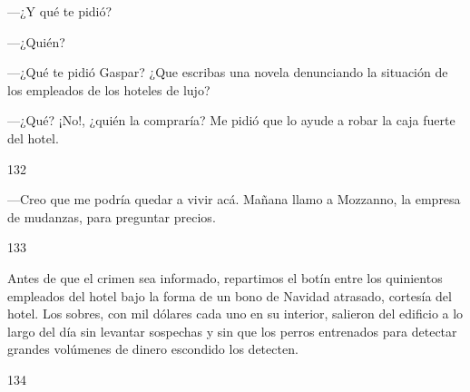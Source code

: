 \documentclass[12pt,twoside,openright,a5paper]{book}
\begin{document}
\nopagebreak

\vspace{0.5cm}

\nopagebreak

---¿Y qué te pidió?

---¿Quién?

---¿Qué te pidió Gaspar? ¿Que escribas una novela denunciando la situación de los empleados de los hoteles de lujo?

---¿Qué? ¡No!, ¿quién la compraría? Me pidió que lo ayude a robar la caja fuerte del hotel.

\vspace{0.5cm}

\hrulefill \hspace{0.1cm}\decofourleft\hspace{0.2cm} 132 \hspace{0.2cm}\decofourright \hspace{0.1cm}\hrulefill

\nopagebreak

\vspace{0.5cm}

\nopagebreak

---Creo que me podría quedar a vivir acá. Mañana llamo a Mozzanno, la empresa de mudanzas, para preguntar precios.

\vspace{0.5cm}

\hrulefill \hspace{0.1cm}\decofourleft\hspace{0.2cm} 133 \hspace{0.2cm}\decofourright \hspace{0.1cm}\hrulefill

\nopagebreak

\vspace{0.5cm}

\nopagebreak

Antes de que el crimen sea informado, repartimos el botín entre los quinientos
empleados del hotel bajo la forma de un bono de Navidad atrasado, cortesía
del hotel. Los sobres, con mil dólares cada uno en su interior, salieron
del edificio a lo largo del día sin levantar sospechas y sin que los perros
entrenados para detectar grandes volúmenes de dinero escondido los detecten.

\vspace{0.5cm}

\hrulefill \hspace{0.1cm}\decofourleft\hspace{0.2cm} 134 \hspace{0.2cm}\decofourright \hspace{0.1cm}\hrulefill
\end{document}
